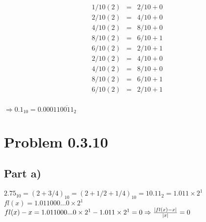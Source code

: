 \documentclass[12pt]{article}
\begin{document}
\begin{eqnarray*}
1/10(2) & = & 2/10 + 0\\
2/10(2) & = & 4/10 + 0\\
4/10(2) & = & 8/10 + 0\\
8/10(2) & = & 6/10 + 1\\
6/10(2) & = & 2/10 + 1\\
2/10(2) & = & 4/10 + 0\\
4/10(2) & = & 8/10 + 0\\
8/10(2) & = & 6/10 + 1\\
6/10(2) & = & 2/10 + 1\\
\end{eqnarray*}

\(\Rightarrow0.1_{10} = 0.00011\overline{0011}_{2}\)
\section*{Problem 0.3.10}

\subsection*{Part a)}
\(2.75_{10} = (2 + 3/4)_{10} = (2 + 1/2 + 1/4)_{10} = 10.11_{2} = 1.011\times2^{1}\)\\
\(fl(x) = 1.011000...0\times2^{1}\)\\
\(fl(x) - x = 1.011000...0\times2^{1} - 1.011\times2^{1} = 0\\
\\
\Rightarrow \frac{\left|fl(x) - x\right|}{\left|x\right|} = 0\)
\end{document}
